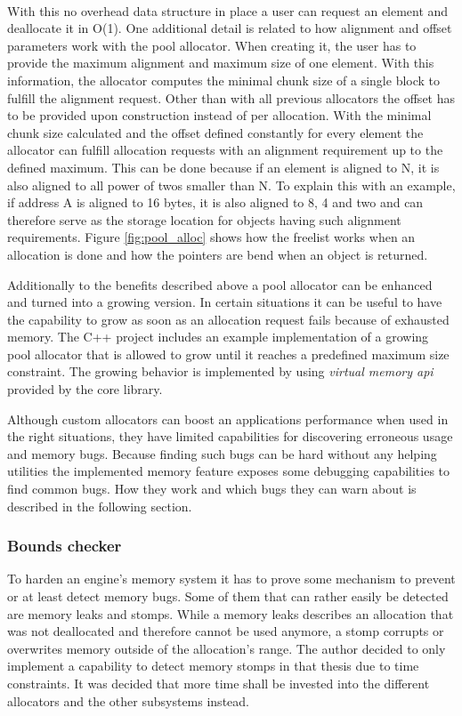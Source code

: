 \noindent
\\
With this no overhead data structure in place a user can request an element and deallocate it in O(1). One additional detail is related to how alignment and offset parameters work with the pool allocator. When creating it, the user has to provide the maximum alignment and maximum size of one element. With this information, the allocator computes the minimal chunk size of a single block to fulfill the alignment request. Other than with all previous allocators the offset has to be provided upon construction instead of per allocation. With the minimal chunk size calculated and the offset defined constantly for every element the allocator can fulfill allocation requests with an alignment requirement up to the defined maximum. This can be done because if an element is aligned to N, it is also aligned to all power of twos smaller than N. To explain this with an example, if address A is aligned to 16 bytes, it is also aligned to 8, 4 and two and can therefore serve as the storage location for objects having such alignment requirements. Figure \ref{fig:pool_alloc} shows how the freelist works when an allocation is done and how the pointers are bend when an object is returned.

Additionally to the benefits described above a pool allocator can be enhanced and turned into a growing version. In certain situations it can be useful to have the capability to grow as soon as an allocation request fails because of exhausted memory. The C++ project includes an example implementation of a growing pool allocator that is allowed to grow until it reaches a predefined maximum size constraint. The growing behavior is implemented by using \textit{virtual memory api} provided by the core library.

Although custom allocators can boost an applications performance when used in the right situations, they have limited capabilities for discovering erroneous usage and memory bugs. Because finding such bugs can be hard without any helping utilities the implemented memory feature exposes some debugging capabilities to find common bugs. How they work and which bugs they can warn about is described in the following section.

\subsubsection{Bounds checker}

To harden an engine's memory system it has to prove some mechanism to prevent or at least detect memory bugs. Some of them that can rather easily be detected are memory leaks and stomps. While a memory leaks describes an allocation that was not deallocated and therefore cannot be used anymore, a stomp corrupts or overwrites memory outside of the allocation's range. The author decided to only implement a capability to detect memory stomps in that thesis due to time constraints. It was decided that more time shall be invested into the different allocators and the other subsystems instead.

